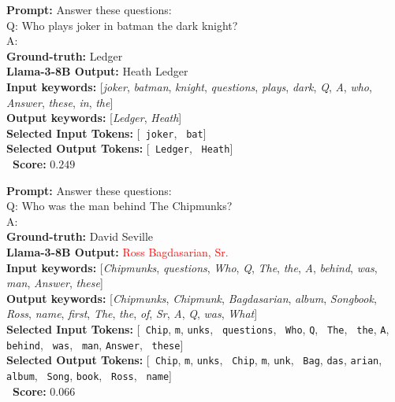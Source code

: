 \begin{tcolorbox}[breakable,title=Example from NQ, colback=gray!5!white, colframe=gray!70!black, boxrule=0.6pt, arc=2mm, left=2mm, right=2mm, top=1mm, bottom=1mm]
\footnotesize
\textbf{Prompt:} Answer these questions:
\\Q: Who plays joker in batman the dark knight?
\\A:\\[1ex]
\textbf{Ground-truth:} Ledger\\
\textbf{Llama-3-8B Output:} \textcolor{OliveGreen}{Heath Ledger}\\

\textbf{Input keywords:} [\textit{joker}, \textit{batman}, \textit{knight}, \textit{questions}, \textit{plays}, \textit{dark}, \textit{Q}, \textit{A}, \textit{who}, \textit{Answer}, \textit{these}, \textit{in}, \textit{the}]\\
\textbf{Output keywords:} [\textit{Ledger}, \textit{Heath}]\\
\textbf{Selected Input Tokens:} [\texttt{ joker}, \texttt{ bat}]\\
\textbf{Selected Output Tokens:} [\texttt{ Ledger}, \texttt{ Heath}]\\

\textbf{\method~Score:} $0.249$
\end{tcolorbox}

\begin{tcolorbox}[breakable,title=Example from TriviaQA, colback=gray!5!white, colframe=gray!70!black, boxrule=0.6pt, arc=2mm, left=2mm, right=2mm, top=1mm, bottom=1mm]
\footnotesize
\textbf{Prompt:} Answer these questions:
\\Q: Who was the man behind The Chipmunks?
\\A:\\[1ex]
\textbf{Ground-truth:} David Seville\\
\textbf{Llama-3-8B Output:} \textcolor{red}{Ross Bagdasarian, Sr.}\\

\textbf{Input keywords:} [\textit{Chipmunks}, \textit{questions}, \textit{Who}, \textit{Q}, \textit{The}, \textit{the}, \textit{A}, \textit{behind}, \textit{was}, \textit{man}, \textit{Answer}, \textit{these}]\\
\textbf{Output keywords:} [\textit{Chipmunks}, \textit{Chipmunk}, \textit{Bagdasarian}, \textit{album}, \textit{Songbook}, \textit{Ross}, \textit{name}, \textit{first}, \textit{The}, \textit{the}, \textit{of}, \textit{Sr}, \textit{A}, \textit{Q}, \textit{was}, \textit{What}]\\
\textbf{Selected Input Tokens:} [\texttt{ Chip}, \texttt{m}, \texttt{unks}, \texttt{ questions}, \texttt{ Who}, \texttt{Q}, \texttt{ The}, \texttt{ the}, \texttt{A}, \texttt{ behind}, \texttt{ was}, \texttt{ man}, \texttt{Answer}, \texttt{ these}]\\
\textbf{Selected Output Tokens:} [\texttt{ Chip}, \texttt{m}, \texttt{unks}, \texttt{ Chip}, \texttt{m}, \texttt{unk}, \texttt{ Bag}, \texttt{das}, \texttt{arian}, \texttt{ album}, \texttt{ Song}, \texttt{book}, \texttt{ Ross}, \texttt{ name}]\\


\textbf{\method~Score:} $0.066$
\end{tcolorbox}

